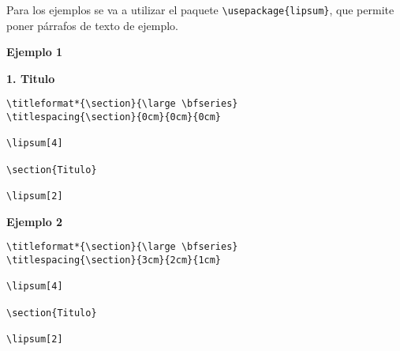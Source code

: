 	Para los ejemplos se va a utilizar el paquete \verb|\usepackage{lipsum}|, que permite poner párrafos de texto de ejemplo.
	
	\textbf{Ejemplo 1}	
		
	\lipsum[4]	
	
	\noindent
	{\large \bfseries{1. Titulo}}
	
	\lipsum[2]
	
	\begin{myquote}
		\begin{lstlisting}
\titleformat*{\section}{\large \bfseries}
\titlespacing{\section}{0cm}{0cm}{0cm}

\lipsum[4]

\section{Titulo}

\lipsum[2]
		\end{lstlisting}
	\end{myquote} 
	
	\textbf{Ejemplo 2}		
	
	\lipsum[4]	
	\vspace{2cm}
	
	\noindent
	\vspace{1cm}
	
	\lipsum[2]
	
	\begin{myquote}
		\begin{lstlisting}
\titleformat*{\section}{\large \bfseries}
\titlespacing{\section}{3cm}{2cm}{1cm}
			
\lipsum[4]
			
\section{Titulo}

\lipsum[2]
		\end{lstlisting}
	\end{myquote} 

	
	